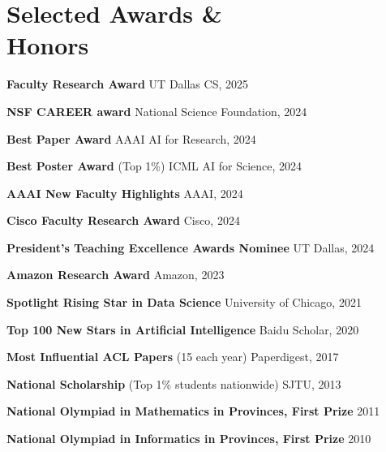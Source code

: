 \vspace{-1mm}
\section{Selected Awards \& \\Honors}

\noindent \textbf{Faculty Research Award} \hfill UT Dallas CS, 2025 

\vspace{-2mm}
\noindent \textbf{NSF CAREER award} \hfill National Science Foundation, 2024 

\vspace{-2mm}
\noindent \textbf{Best Paper Award} \hfill AAAI AI for Research, 2024 

\vspace{-2mm}
\noindent \textbf{Best Poster Award} {\small (Top 1\%)} \hfill ICML AI for Science, 2024

\vspace{-2mm}
\noindent \textbf{AAAI New Faculty Highlights} \hfill AAAI, 2024

\vspace{-2mm}
\noindent \textbf{Cisco Faculty Research Award} \hfill Cisco, 2024



\vspace{-2mm}
\noindent \textbf{President's Teaching Excellence Awards Nominee} \hfill UT Dallas, 2024


\vspace{-2mm}
\noindent \textbf{Amazon Research Award} \hfill Amazon, 2023 

\vspace{-2mm}
\noindent \textbf{Spotlight Rising Star in Data Science} \hfill University of Chicago, 2021 

\vspace{-2mm}
\noindent \textbf{Top 100 New Stars in Artificial Intelligence} \hfill Baidu Scholar, 2020 


\vspace{-2mm}
\noindent \textbf{Most Influential ACL Papers} {\small (15 each year)} \hfill Paperdigest, 2017 

\vspace{-2mm}
\noindent \textbf{National Scholarship} {\small (Top 1\% students nationwide)} \hfill SJTU, 2013 

\vspace{-2mm}
\noindent \textbf{National Olympiad in Mathematics in Provinces, First Prize} \hfill 2011 


\vspace{-2mm}
\noindent \textbf{National Olympiad in Informatics in Provinces, First Prize} \hfill 2010 \\

